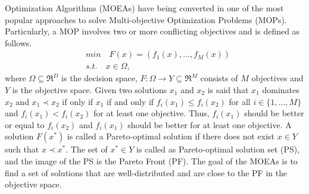  Optimization Algorithms (MOEAs) have being converted in one of the most popular approaches to solve Multi-objective Optimization Problems (MOPs).
%
Particularly, a MOP involves two or more conflicting objectives and is defined as follows.
%
\begin{equation}
\begin{split}
&min \quad F(x) = (f_1(x), ..., f_M(x)) \\
&s.t. \quad x \in \Omega,
\end{split}
\end{equation}
where $\Omega \subseteq \Re^D$ is the decision space, $F: \Omega \rightarrow Y \subseteq \Re^M$ consists of $M$ objectives and $Y$ is the objective space.
%
Given two solutions $x_1$ and $x_2$ is said that $x_1$ dominates $x_2$ and $x_1 \prec x_2$ if only if $x_1$ if and only if $f_i(x_1) \leq f_i(x_2)$ for all $i \in \{1,...,M\}$ and $f_i(x_1) < f_i(x_2)$ for at least one objective.
%
Thus, $f_i(x_1)$ should be better or equal to $f_i(x_2)$ and $f_i(x_1)$ should be better for at least one objective.
%
A solution $F(x^*)$ is called a Pareto-optimal solution if there does not exist $x \in Y$ such that $x \prec x^*$.
%
The set of $x^* \in Y$ is called as Pareto-optimal solution set (PS), and the image of the PS is the Pareto Front (PF).
%
The goal of the MOEAs is to find a set of solutions that are well-distributed and are close to the PF in the objective space.

